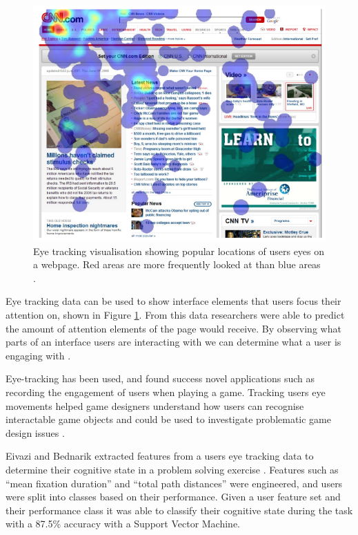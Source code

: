 \documentclass{article}
\begin{document}
\begin{figure}[ht!]
    \centering
    \centerline{
        \includegraphics[scale=0.6]{Images/EyeHeatmap.PNG}
    }
    \caption{Eye tracking visualisation showing popular locations of users eyes on a webpage. Red areas are more frequently looked at than blue areas \cite{buscher2009you}.}
    \label{fig:eyetrack}
\end{figure}

Eye tracking data can be used to show interface elements that users focus their attention on, shown in Figure \ref{fig:eyetrack}. 
From this data researchers were able to predict the amount of attention elements of the page would receive.
By observing what parts of an interface users are interacting with we can determine what a user is engaging with \cite{buscher2009you}.

Eye-tracking has been used, and found success novel applications such as recording the engagement of users when playing a game. 
Tracking users eye movements helped game designers understand how users can recognise interactable game objects and could be used to investigate problematic game design issues \cite{renshaw2009towards}.

Eivazi and Bednarik extracted features from a users eye tracking data to determine their cognitive state in a problem solving exercise \cite{eivazi2011predicting}.
Features such as ``mean fixation duration'' and ``total path distances'' were engineered, and users were split into classes based on their performance. 
Given a user feature set and their performance class it was able to classify their cognitive state during the task with a 87.5\% accuracy with a Support Vector Machine.
\end{document}
